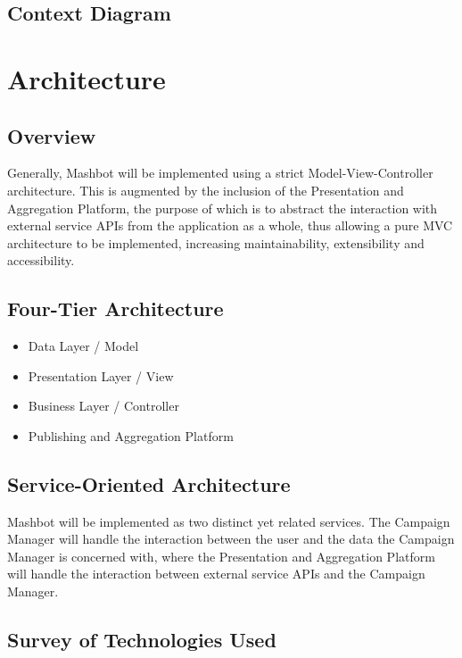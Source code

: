\documentclass{article}
\begin{document}
\subsection{Context Diagram}
\section{Architecture}
\subsection{Overview}
Generally, Mashbot will be implemented using a strict Model-View-Controller architecture.  This is augmented by the inclusion of the Presentation and Aggregation Platform, the purpose of which is to abstract the interaction with external service APIs from the application as a whole, thus allowing a pure MVC architecture to be implemented, increasing maintainability, extensibility and accessibility.
\subsection{Four-Tier Architecture}
\begin{itemize}
\item Data Layer / Model
\item Presentation Layer / View
\item Business Layer / Controller
\item Publishing and Aggregation Platform
\end{itemize}
\subsection{Service-Oriented Architecture}
Mashbot will be implemented as two distinct yet related services.  The Campaign Manager will handle the interaction between the user and the data the Campaign Manager is concerned with, where the Presentation and Aggregation Platform will handle the interaction between external service APIs and the Campaign Manager.
\subsection{Survey of Technologies Used}
\end{document}
